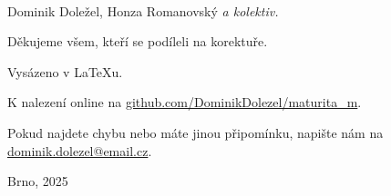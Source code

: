 \thispagestyle{fancy-blank}
\,
\vfill
{\huge\bfseries\utitle\par}
\vspace{5mm}
{\Large Dominik Doležel, Honza Romanovský} \textit{a kolektiv.}\par
\vspace{10mm}
Děkujeme všem, kteří se podíleli na korektuře. \par
Vysázeno v \LaTeX u.\par
K nalezení online na \href{https://github.com/DominikDolezel/maturita_m}{github.com/DominikDolezel/maturita\_m}.\par
Pokud najdete chybu nebo máte jinou připomínku, napište nám na \href{mailto:dominik.dolezel@email.cz}{dominik.dolezel@email.cz}. \par
Brno, 2025
\clearpage

